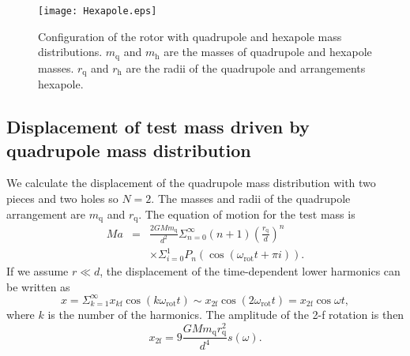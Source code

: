 \documentclass[%
 reprint,
superscriptaddress,
 amsmath,amssymb,
 aps,
]{revtex4-1}
\begin{document}
\begin{figure}
\begin{center}
\texttt{[image: Hexapole.eps]}
\caption{Configuration of the rotor with quadrupole and hexapole mass distributions. $m_{\mathrm{q}}$ and $m_{\mathrm{h}}$ are the masses of quadrupole and hexapole masses. $r_{\mathrm{q}}$ and $r_{\mathrm{h}}$ are the radii of the quadrupole and arrangements hexapole.}
\label{fig:hex}
\end{center}
\end{figure}

\subsection{Displacement of test mass driven by quadrupole mass distribution} \label{Quad}
We calculate the displacement of the quadrupole mass distribution with two pieces and two holes so $N=2$.
The masses and radii of the quadrupole arrangement are $m_{\mathrm{q}}$ and $r_{\mathrm{q}}$. 
The equation of motion for the test mass is
\begin{eqnarray}
Ma&=&\frac{2GMm_{\mathrm{q}}}{d^2}\Sigma^{\infty}_{n=0}(n+1) \left( \frac{r_{\mathrm{q}}}{d} \right)^n \nonumber \\
&&\times \Sigma^1_{i=0}  P_n\left(\cos{\left(\omega_{\mathrm{rot}} t +\pi i \right)}\right).
\end{eqnarray} 
If we assume $r \ll d$, the displacement of the time-dependent lower harmonics can be written as
\begin{equation}
x=\Sigma_{k=1}^{\infty}x_{k\mathrm{f}}\cos(k\omega_{\mathrm{rot}} t)\sim x_{\mathrm{2f}}\cos(2\omega_{\mathrm{rot}} t)=x_{\mathrm{2f}}\cos{\omega t},
\end{equation}
where $k$ is the number of the harmonics. 
The amplitude of the 2-f rotation is then
\begin{equation}
x_{2\mathrm{f}}=9\frac{GMm_{\mathrm{q}}r_{\mathrm{q}}^2}{d^4}s(\omega). \label{2f}
\end{equation}
\end{document}
